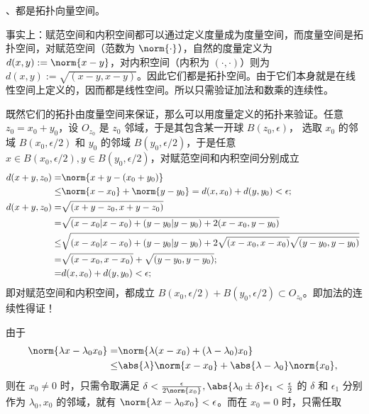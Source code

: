 \begin{example}{}
、都是拓扑向量空间。

事实上：赋范空间和内积空间都可以通过定义度量成为度量空间，而度量空间是拓扑空间，对赋范空间（范数为 $\norm{\cdot}$），自然的度量定义为 $d(x,y):=\norm{x-y}$，对内积空间（内积为 $(\cdot,\cdot)$）则为 $d(x,y):=\sqrt{(x-y,x-y)}$。因此它们都是拓扑空间。由于它们本身就是在线性空间上定义的，因而都是线性空间。所以只需验证加法和数乘的连续性。

既然它们的拓扑由度量空间来保证，那么可以用度量定义的拓扑来验证。任意 $z_0=x_0+y_0$，设 $O_{z_0}$ 是 $z_0$ 邻域，于是其包含某一开球  $B(z_0,\epsilon)$， 选取 $x_0$ 的邻域 $B(x_0,\epsilon/2)$ 和 $y_0$ 的邻域 $B(y_0,\epsilon/2)$，于是任意 $x\in B(x_0,\epsilon/2),y\in B(y_0,\epsilon/2)$，对赋范空间和内积空间分别成立 
\begin{equation}
\begin{aligned}
d(x+y,z_0)=&\norm{x+y-(x_0+y_0)}\\
\leq& \norm{x-x_0}+\norm{y-y_0}=d(x,x_0)+d(y,y_0)< \epsilon;\\
d(x+y,z_0)=&\sqrt{(x+y-z_0,x+y-z_0)}\\
=&\sqrt{(x-x_0|x-x_0)+(y-y_0|y-y_0)+2(x-x_0,y-y_0)}\\
\leq&\sqrt{(x-x_0|x-x_0)+(y-y_0|y-y_0)+2\sqrt{(x-x_0,x-x_0)}\sqrt{(y-y_0,y-y_0)}}\\
=& \sqrt{(x-x_0,x-x_0)}+\sqrt{(y-y_0,y-y_0)};\\
=&d(x,x_0)+d(y,y_0)< \epsilon;\\
\end{aligned}~
\end{equation}
即对赋范空间和内积空间，都成立 $B(x_0,\epsilon/2)+B(y_0,\epsilon/2)\subset O_{z_0}$。即加法的连续性得证！

由于
\begin{equation}
\begin{aligned}
\norm{\lambda x-\lambda_0x_0}=&\norm{\lambda(x-x_0)+(\lambda-\lambda_0)x_0}\\
\leq&\abs{\lambda}\norm{x-x_0}+\abs{\lambda-\lambda_0}\norm{x_0},\\
\end{aligned}~
\end{equation}
则在 $x_0\neq0$ 时，只需令取满足 $\delta<\frac{\epsilon}{2\norm{x_0}},\abs{\lambda_0\pm \delta}\epsilon_1<\frac{\epsilon}{2}$ 的 $\delta$ 和 $\epsilon_1$ 分别作为 $\lambda_0,x_0$ 的邻域，就有 $\norm{\lambda x-\lambda_0x_0}<\epsilon$。而在 $x_0=0$ 时，只需任取
\end{example}



